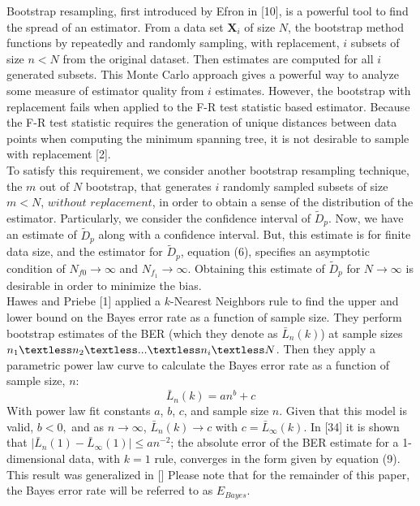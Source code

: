 \documentclass{article}
\begin{document}
	\indent Bootstrap resampling, first introduced by Efron in [10], is a powerful tool to find the spread of an estimator. From a data set $\textbf{X}_i$ of size $N$, the bootstrap method functions by repeatedly and randomly sampling, with replacement, $i$ subsets of size $n<N$ from the original dataset. Then estimates are computed for all $i$ generated subsets. This Monte Carlo approach gives a powerful way to analyze some measure of estimator quality from $i$ estimates. However, the bootstrap with replacement fails when applied to the F-R test statistic based estimator. Because the F-R test statistic requires the generation of unique distances between data points when computing the minimum spanning tree, it is not desirable to sample with replacement [2]. 
	\\ [0.5ex]
	
	\indent To satisfy this requirement, we consider another bootstrap resampling technique, the $m$ out of $N$ bootstrap, that generates $i$ randomly sampled subsets of size $m<N$, $without$ $replacement$, in order to obtain a sense of the distribution of the estimator. Particularly, we consider the confidence interval of $\widetilde{D}_p$. Now, we have an estimate of $\widetilde{D}_p$ along with a confidence interval. But, this estimate is for finite data size, and the estimator for $\widetilde{D}_p$, equation (6), specifies an asymptotic condition of $N_{f0} \rightarrow \infty$ and $N_{f_1} \rightarrow \infty$. Obtaining this estimate of $\widetilde{D}_p$ for $N \rightarrow \infty$ is desirable in order to minimize the bias.
	\\ [0.5ex]
	
	\indent Hawes and Priebe [1] applied a $k$-Nearest Neighbors rule to find the upper and lower bound on the Bayes error rate as a function of sample size. They perform bootstrap estimates of the BER (which they denote as $\bar{L}_n(k)$) at sample sizes $n_1 \textless n_2 \textless ... \textless n_i \textless N$. Then they apply a parametric power law curve to calculate the Bayes error rate as a function of sample size, $n$:
		\begin{equation}
		\bar{L}_n(k)=an^b+c
		\end{equation}
	With power law fit constants $a$, $b$, $c$, and sample size $n$. Given that this model is valid, $b<0,$ and as $n \rightarrow \infty$, $\bar{L}_n(k)\rightarrow c$ with $c=\bar{L}_\infty(k)$. In [34] it is shown that $\vert \bar{L}_n(1)-\bar{L}_\infty (1) \vert \leq an^{-2}$; the absolute error of the BER estimate for a 1-dimensional data, with $k=1$ rule, converges in the form given by equation (9). This result was generalized in []
	Please note that for the remainder of this paper, the Bayes error rate will be referred to as $E_{Bayes}$.
	
\end{document}
